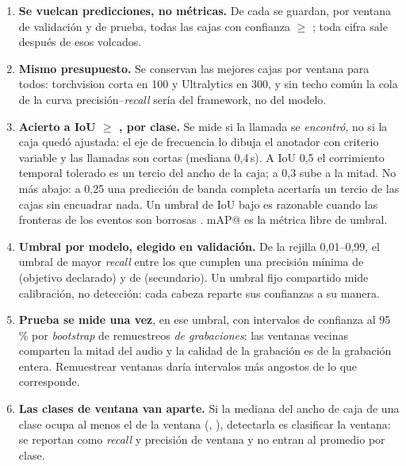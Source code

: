 \documentclass[12pt,a4paper]{article}
\begin{document}
\begin{enumerate}
    \item \textbf{Se vuelcan predicciones, no métricas.} De cada  se guardan,
          por ventana de validación y de prueba, todas las cajas con confianza
          $\geq$ \scoreFloor{}; toda cifra sale después de esos volcados.
    \item \textbf{Mismo presupuesto.} Se conservan las \maxDetections{} mejores cajas por
          ventana para todos: torchvision corta en 100 y Ultralytics en 300, y sin techo común
          la cola de la curva precisión--\textit{recall} sería del framework, no del modelo.
    \item \textbf{Acierto a IoU $\geq$ \matchIou{}, por clase.} Se mide si la llamada se
          \emph{encontró}, no si la caja quedó ajustada: el eje de frecuencia lo dibuja el
          anotador con criterio variable y las llamadas son cortas (mediana 0,4\,s). A IoU
          0,5 el corrimiento temporal tolerado es un tercio del ancho de la caja; a 0,3 sube
          a la mitad. No más abajo: a 0,25 una predicción de banda completa acertaría un
          tercio de las cajas sin encuadrar nada. Un umbral de IoU bajo es razonable cuando las
          fronteras de los eventos son borrosas \citep{zhu_sound_2025}. mAP@\matchIou{} es
          la métrica libre de umbral. 
    \item \textbf{Umbral por modelo, elegido en validación.} De la rejilla 0,01--0,99, el
          umbral de mayor \textit{recall} entre los que cumplen una precisión mínima de
          \minPrecision{} (objetivo declarado) y de \minPrecisionAlt{} (secundario). Un
          umbral fijo compartido mide calibración, no detección: cada cabeza reparte sus
          confianzas a su manera.
    \item \textbf{Prueba se mide una vez}, en ese umbral, con intervalos de confianza al
          95\,\% por \textit{bootstrap} de \nBootstrap{} remuestreos \emph{de grabaciones}:
          las ventanas vecinas comparten la mitad del audio y la calidad de la grabación es
          de la grabación entera. Remuestrear ventanas daría intervalos más angostos de lo que
          corresponde. 
    \item \textbf{Las clases de ventana van aparte.} Si la mediana del ancho de caja de una
          clase ocupa al menos el \windowClassWidth{} de la ventana (,
          ), detectarla es clasificar la ventana: se reportan como
          \textit{recall} y precisión de ventana y no entran al promedio por clase.
\end{enumerate}
\end{document}
